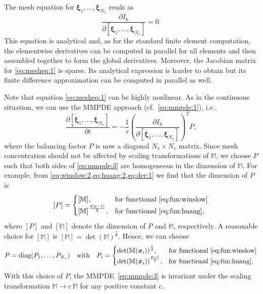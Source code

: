 \documentclass[american]{scrartcl}
\providecommand{\V}[1]{\boldsymbol{#1}}
\providecommand{\p}[2]{\frac{\partial{}#1}{\partial{}#2}}
\providecommand{\M}{\mathbb{M}}
\theoremstyle{remark}
\begin{document}
The mesh equation for $\V{\xi}_{1},\dotsc,\V{\xi}_{N_v}$ reads as
\begin{equation}
   \p{I_h}{[\V{\xi}_{1},\dotsc,\V{\xi}_{N_v}]} = 0
   .
   \label{eq:mesheq:1}
\end{equation}
This equation is analytical and, as for the standard finite element computation, the elementwise derivatives can be computed in parallel for all elements and then assembled together to form the global derivatives.
Moreover, the Jacobian matrix for \cref{eq:mesheq:1} is sparse.
Its analytical expression is harder to obtain but its finite difference approximation can be computed in parallel as well.

Note that equation \cref{eq:mesheq:1} can be highly nonlinear.
As in the continuous situation, we can use the MMPDE approach (cf.~\cref{eq:mmpde:1}), i.e.,
\begin{equation}
   \p{[\V{\xi}_{1},\dotsc,\V{\xi}_{N_v}]}{t}
      = -\frac{1}{\tau} {\left( \p{I_h}{[\V{\xi}_{1},\dotsc,\V{\xi}_{N_v}]} \right )}^T P,
   \label{eq:mmpde:3}
\end{equation}
where the balancing factor $P$ is now a diagonal $N_v \times N_v$ matrix.
Since mesh concentration should not be affected by scaling transformations of $\M$, we choose $P$ such that both sides of \cref{eq:mmpde:3} are homogeneous in the dimension of $\M$.
For example, from \cref{eq:winslow:2,eq:huang:2,eq:der:1} we find that the dimension of $P$ is
\[
   [P] =
   \begin{cases}
      [\M],
         & \text{for functional \cref{eq:fun:winslow}} \\
      {[\M]}^{\frac{d (p-1)}{2}} ,
         & \text{for functional \cref{eq:fun:huang}}
         ,
   \end{cases}
\]
where $[P]$ and $[\M]$ denote the dimension of $P$ and $\M$, respectively.
A reasonable choice for $[\M]$ is $[\M] = {\det(\M)}^{\frac{1}{d}}$.
Hence, we can choose
\begin{equation}
   P = \operatorname{diag}(P_1,\dotsc,P_{N_v})
   \quad \text{with} \quad
   P_i =
      \begin{cases}
         {\det(\M(\V{x}_i))}^{\frac{1}{d}},
            & \text{for functional \cref{eq:fun:winslow}} \\
         {\det(\M(\V{x}_i))}^{\frac{p-1}{2}},
            & \text{for functional \cref{eq:fun:huang}} .
   \end{cases}
   \label{eqP:1}
\end{equation}
With this choice of $P$, the MMPDE~\cref{eq:mmpde:3} is invariant under the scaling transformation $\M \to c \, \M$ for any positive constant $c$.
\end{document}
